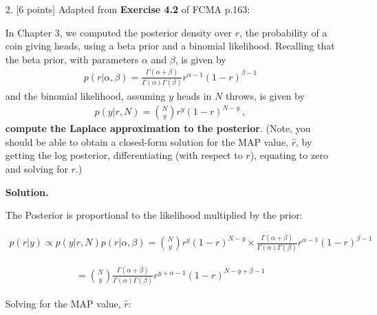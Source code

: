 \documentclass[10pt]{article}
\begin{document}
\begin{itemize}
Here, we can see that the posterior is in the same form as the inverse Gamma distribution with parameters:

\begin{align*}
    \alpha_{new} = \frac{N}{2} + \alpha
\end{align*}

and

\begin{align*}
    \beta_{new} = \beta + \frac{1}{2} \sum^{N}_{d=1} (t_d - x_d w)^2
\end{align*}


\item[2.]  [6 points]
Adapted from {\bf Exercise 4.2} of FCMA p.163:

In Chapter 3, we computed the posterior density over $r$, the probability of a coin giving heads, using a beta prior and a binomial likelihood.  Recalling that the beta prior, with parameters $\alpha$ and $\beta$, is given by
\begin{eqnarray*}
p(r | \alpha, \beta) = \frac{\Gamma(\alpha + \beta)}{\Gamma(\alpha) \Gamma(\beta)} r^{\alpha - 1} (1 - r)^{\beta - 1}
\end{eqnarray*}
and the binomial likelihood, assuming $y$ heads in $N$ throws, is given by
\begin{eqnarray*}
p(y | r, N) = {N \choose y} r^{y} (1 - r)^{N-y} ~,
\end{eqnarray*}
{\bf compute the Laplace approximation to the posterior}.  (Note, you should be able to obtain a closed-form solution for the MAP value, $\hat{r}$, by getting the log posterior, differentiating (with respect to $r$), equating to zero and solving for $r$.)

{\bf Solution.}

The Posterior is proportional to the likelihood multiplied by the prior:

\begin{align*}
    p(r | y) \propto p(y | r, N) p(r | \alpha, \beta) =
    {N \choose y} r^{y} (1 - r)^{N-y} \times 
    \frac{\Gamma(\alpha + \beta)}{\Gamma(\alpha) \Gamma(\beta)} r^{\alpha - 1} (1 - r)^{\beta - 1}
\end{align*}

\begin{align*}
    = {N \choose y} \frac{\Gamma(\alpha + \beta)}{\Gamma(\alpha) \Gamma(\beta)}
    r^{y + \alpha - 1} (1 - r)^{N-y + \beta - 1}
\end{align*}

Solving for the MAP value, $\hat{r}$:


\end{itemize}
\end{document}

